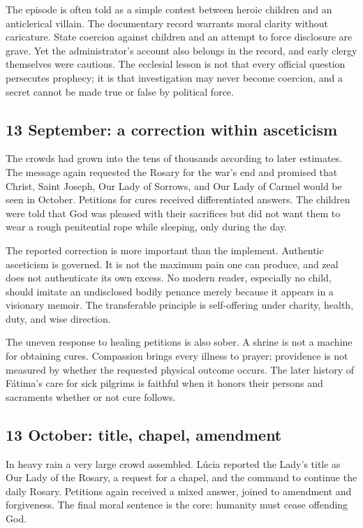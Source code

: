 The episode is often told as a simple contest between heroic children and an anticlerical villain. The documentary record warrants moral clarity without caricature. State coercion against children and an attempt to force disclosure are grave. Yet the administrator's account also belongs in the record, and early clergy themselves were cautious. The ecclesial lesson is not that every official question persecutes prophecy; it is that investigation may never become coercion, and a secret cannot be made true or false by political force.

\subsection{13 September: a correction within asceticism}

The crowds had grown into the tens of thousands according to later estimates. The message again requested the Rosary for the war's end and promised that Christ, Saint Joseph, Our Lady of Sorrows, and Our Lady of Carmel would be seen in October. Petitions for cures received differentiated answers. The children were told that God was pleased with their sacrifices but did not want them to wear a rough penitential rope while sleeping, only during the day.

The reported correction is more important than the implement. Authentic asceticism is governed. It is not the maximum pain one can produce, and zeal does not authenticate its own excess. No modern reader, especially no child, should imitate an undisclosed bodily penance merely because it appears in a visionary memoir. The transferable principle is self-offering under charity, health, duty, and wise direction.

The uneven response to healing petitions is also sober. A shrine is not a machine for obtaining cures. Compassion brings every illness to prayer; providence is not measured by whether the requested physical outcome occurs. The later history of Fátima's care for sick pilgrims is faithful when it honors their persons and sacraments whether or not cure follows.

\subsection{13 October: title, chapel, amendment}

In heavy rain a very large crowd assembled. Lúcia reported the Lady's title as Our Lady of the Rosary, a request for a chapel, and the command to continue the daily Rosary. Petitions again received a mixed answer, joined to amendment and forgiveness. The final moral sentence is the core: humanity must cease offending God.

